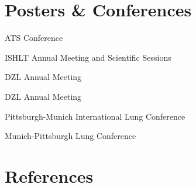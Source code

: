 \documentclass[10pt]{article} %
\begin{document}
\begin{paracol}{2}
\fi


\vspace{-\baselineskip}\medskip %

\pagebreak
\section{Posters \& Conferences}
{} %
{ATS Conference} %
{} %
{} %

{} %
{ISHLT Annual Meeting and Scientific Sessions} %
{} %
{} %

{} %
{DZL Annual Meeting} %
{} %
{} %

{} %
{DZL Annual Meeting} %
{} %
{} %

{} %
{Pittsburgh-Munich International Lung Conference} %
{} %
{} %

{} %
{Munich-Pittsburgh Lung Conference} %
{} %
{} %




\section{References}




\end{paracol}
\end{document}
